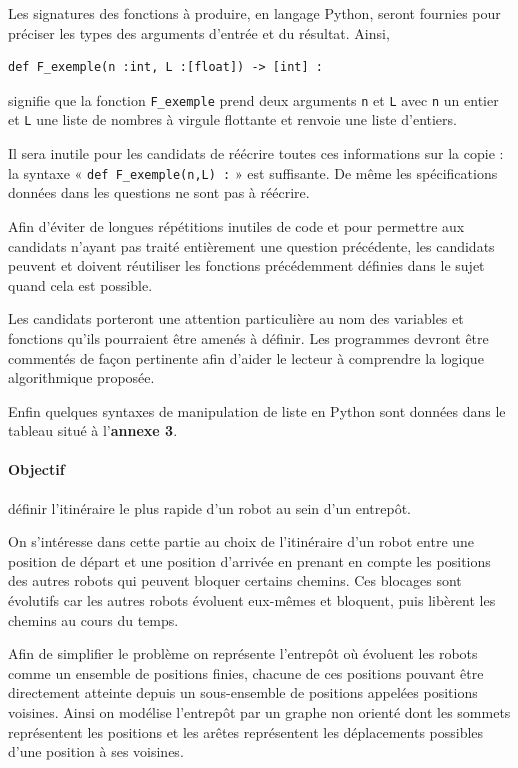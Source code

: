 Les signatures des fonctions à produire, en langage Python, seront fournies pour préciser les types des arguments d'entrée et du résultat. Ainsi,

\begin{lstlisting}
def F_exemple(n :int, L :[float]) -> [int] :
\end{lstlisting}

signifie que la fonction \texttt{F\_exemple} prend deux arguments \texttt{n} et \texttt{L} avec \texttt{n} un entier et \texttt{L} une liste de nombres à virgule flottante et renvoie une liste d'entiers.

Il sera inutile pour les candidats de réécrire toutes ces informations sur la copie : la syntaxe « \texttt{def F\_exemple(n,L) :} » est suffisante. De même les spécifications données dans les questions ne sont pas à réécrire.

Afin d'éviter de longues répétitions inutiles de code et pour permettre aux candidats n'ayant pas traité entièrement une question précédente, les candidats peuvent et doivent réutiliser les fonctions précédemment définies dans le sujet quand cela est possible.

Les candidats porteront une attention particulière au nom des variables et fonctions qu'ils pourraient être amenés à définir. Les programmes devront être commentés de façon pertinente afin d'aider le lecteur à comprendre la logique algorithmique proposée.

Enfin quelques syntaxes de manipulation de liste en Python sont données dans le tableau situé à l'\textbf{annexe 3}.

\medskip

\paragraph{Objectif} définir l'itinéraire le plus rapide d'un robot au sein d'un entrepôt.

On s'intéresse dans cette partie au choix de l'itinéraire d'un robot entre une position de départ et une position d'arrivée en prenant en compte les positions des autres robots qui peuvent bloquer certains chemins. Ces blocages sont évolutifs car les autres robots évoluent eux-mêmes et bloquent, puis libèrent les chemins au cours du temps.

\medskip

Afin de simplifier le problème on représente l'entrepôt où évoluent les robots comme un ensemble de positions finies, chacune de ces positions pouvant être directement atteinte depuis un sous-ensemble de positions appelées positions voisines. Ainsi on modélise l'entrepôt par un graphe non orienté dont les sommets représentent les positions et les arêtes représentent les déplacements possibles d'une position à ses voisines.

